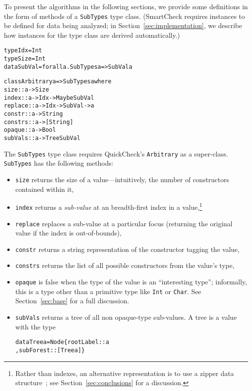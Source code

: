 \documentclass{sigplanconf}
\newenvironment{code}{\begin{alltt}}{\end{alltt}}
\newcommand{\ttp}[1]{\texttt{#1}}
\begin{document}
To present the algorithms in the following sections, we provide some definitions
in the form of methods of a \ttp{SubTypes} type class.  (SmartCheck requires
instances to be defined for data being analyzed; in
Section~\ref{sec:implementation}, we describe how instances for the type class
are derived automatically.)
%
\begin{code}
type Idx    = Int
type Size   = Int
data SubVal = forall a. SubTypes a => SubVal a

class Arbitrary a => SubTypes a where
  size    :: a -> Size
  index   :: a -> Idx -> Maybe SubVal
  replace :: a -> Idx -> SubVal -> a
  constr  :: a -> String
  constrs :: a -> [String]
  opaque  :: a -> Bool
  subVals :: a -> Tree SubVal
\end{code}
%
\noindent
The \ttp{SubTypes} type class requires QuickCheck's \ttp{Arbitrary} as a
super-class.  \ttp{SubTypes} has the following methods:
\begin{itemize}
\item \ttp{size} returns the size of a value---intuitively, the number of
  constructors contained within it,
\item \ttp{index} returns a \emph{sub-value} at an breadth-first index in a
  value,\footnote{Rather than indexes, an alternative representation is to use a
    zipper data structure~\cite{zipper}; see Section~\ref{sec:conclusions} for a
    discussion.}
\item \ttp{replace} replaces a sub-value at a particular focus (returning the
  original value if the index is out-of-bounds),
\item \ttp{constr} returns a string representation of the constructor tagging
  the value,
\item \ttp{constrs} returns the list of all possible constructors from the
  value's type,
\item \ttp{opaque} is false when the type of the value is an ``interesting
  type''; informally, this is a type other than a primitive type like \ttp{Int}
  or \ttp{Char}.  See Section~\ref{sec:base} for a full discussion.
\item \ttp{subVals} returns a tree of all non opaque-type sub-values.  A tree is a
  value with the type
%
  \begin{code}
data Tree a = Node \{ rootLabel :: a
                   , subForest :: [Tree a] \}
  \end{code}
%
\end{itemize}
\end{document}
